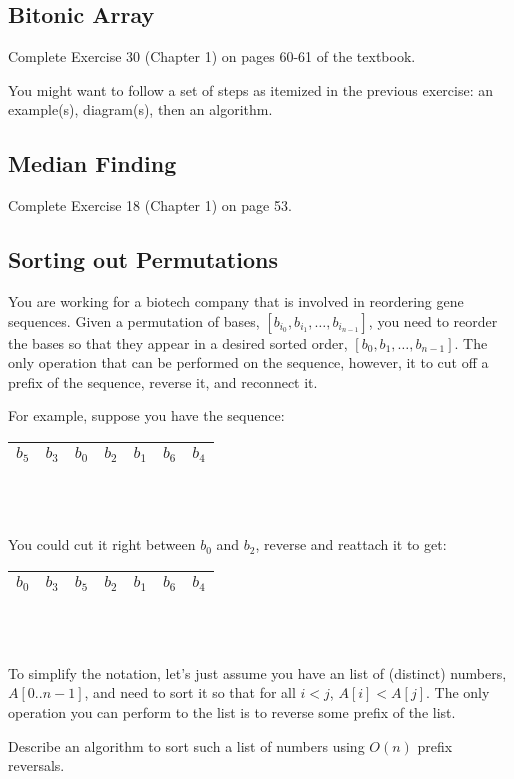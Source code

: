 \documentclass[12pt]{article}
\begin{document}
\subsection{Bitonic Array}

Complete Exercise 30 (Chapter 1) on pages 60-61 of the textbook. 

You might want to follow a set of steps as itemized in the previous exercise: an example(s), diagram(s), then an algorithm.


\subsection{Median Finding}

Complete Exercise 18 (Chapter 1) on page 53.


\subsection{Sorting out Permutations}

You are working for a biotech company that is involved in reordering gene sequences. Given a permutation of bases, $[ b_{i_0}, b_{i_1}, \ldots, b_{i_{n-1}}]$, you need to reorder the bases so that they appear in a desired sorted order, $[b_0, b_1, \ldots, b_{n-1}]$. The only operation that can be performed on the sequence, however, it to cut off a prefix of the sequence, reverse it, and reconnect it.

For example, suppose you have the sequence:

\begin{tabular}{|*{7}{c|}}
    \hline
    $b_5$  & $b_3$  & $b_0$ & $b_2$ & $b_1$ & $b_6$ & $b_4$ \\
    \hline
  \end{tabular}\\~

You could cut it right between $b_0$ and $b_2$, reverse and reattach it to get:

\begin{tabular}{|*{7}{c|}}
    \hline
    $b_0$  & $b_3$  & $b_5$ & $b_2$ & $b_1$ & $b_6$ & $b_4$ \\
    \hline
  \end{tabular}\\~

\noindent To simplify the notation, let's just assume you have an list of (distinct) numbers, $A[0..n-1]$, and need to sort it so that for all $i < j$, $A[i] < A[j]$. The only operation you can perform to the list is to reverse some prefix of the list.

Describe an algorithm to sort such a list of numbers using $O(n)$ prefix reversals.
\end{document}
